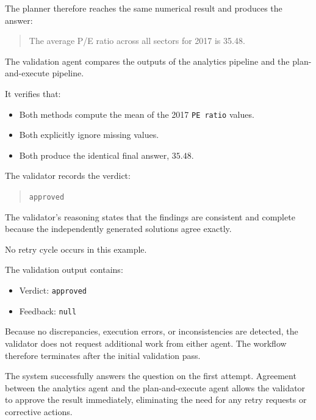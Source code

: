 The planner therefore reaches the same numerical result and produces the answer:

\begin{quote}
  The average P/E ratio across all sectors for 2017 is 35.48.
\end{quote}


The validation agent compares the outputs of the analytics pipeline and the plan-and-execute pipeline.

It verifies that:

\begin{itemize}
  \item Both methods compute the mean of the 2017 \texttt{PE ratio} values.
  \item Both explicitly ignore missing values.
  \item Both produce the identical final answer, \(35.48\).
\end{itemize}

The validator records the verdict:

\begin{quote}
  \texttt{approved}
\end{quote}

The validator's reasoning states that the findings are consistent and complete because the independently generated solutions agree exactly.


No retry cycle occurs in this example.

The validation output contains:

\begin{itemize}
  \item Verdict: \texttt{approved}
  \item Feedback: \texttt{null}
\end{itemize}

Because no discrepancies, execution errors, or inconsistencies are detected, the validator does not request additional work from either agent. The workflow therefore terminates after the initial validation pass.


The system successfully answers the question on the first attempt. Agreement between the analytics agent and the plan-and-execute agent allows the validator to approve the result immediately, eliminating the need for any retry requests or corrective actions.

